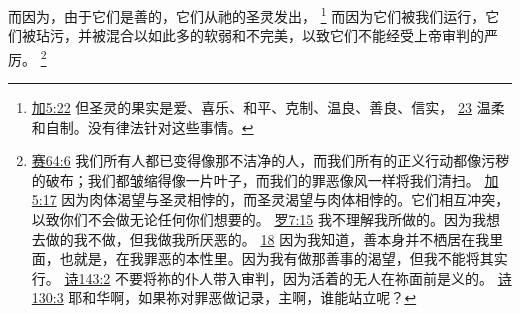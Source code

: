 \documentclass[12pt, a4paper, oneside]{ctexart}
\begin{document}
	而因为，由于它们是善的，它们从祂的圣灵发出，
	\footnote {
		\href{https://biblehub.com/galatians/5-22.htm}{加5:22} 但圣灵的果实是爱、喜乐、和平、克制、温良、善良、信实，
		\href{https://biblehub.com/galatians/5-23.htm}{23} 温柔和自制。没有律法针对这些事情。
	}
	而因为它们被我们运行，它们被玷污，并被混合以如此多的软弱和不完美，以致它们不能经受上帝审判的严厉。
	\footnote {
		\href{https://biblehub.com/isaiah/64-6.htm}{赛64:6} 我们所有人都已变得像那不洁净的人，而我们所有的正义行动都像污秽的破布；我们都皱缩得像一片叶子，而我们的罪恶像风一样将我们清扫。
		\href{https://biblehub.com/galatians/5-17.htm}{加5:17} 因为肉体渴望与圣灵相悖的，而圣灵渴望与肉体相悖的。它们相互冲突，以致你们不会做无论任何你们想要的。
		\href{https://biblehub.com/romans/7-15.htm}{罗7:15} 我不理解我所做的。因为我想去做的我不做，但我做我所厌恶的。
		\href{https://biblehub.com/romans/7-18.htm}{18} 因为我知道，善本身并不栖居在我里面，也就是，在我罪恶的本性里。因为我有做那善事的渴望，但我不能将其实行。
		\href{https://biblehub.com/psalms/143-2.htm}{诗143:2} 不要将祢的仆人带入审判，因为活着的无人在祢面前是义的。
		\href{https://biblehub.com/psalms/130-3.htm}{诗130:3} 耶和华啊，如果祢对罪恶做记录，主啊，谁能站立呢？
	}
\end{document}
